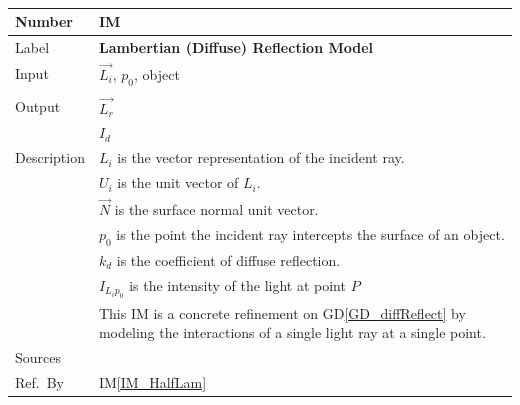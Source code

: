 \documentclass[12pt]{article}
\newcommand{\colAwidth}{0.13\textwidth}
\newcommand{\colBwidth}{0.82\textwidth}
\newcommand{\dref}[1]{GD\ref{#1}}
\newcounter{instnum} %
\newcommand{\iref}[1]{IM\ref{#1}}
\begin{document}
~\newline


\noindent
\begin{minipage}{\textwidth}
	\renewcommand*{\arraystretch}{1.5}
	\begin{tabular}{| p{\colAwidth} | p{\colBwidth}|}
		\hline
		\rowcolor[gray]{0.9}
		Number& IM{instnum}\theinstnum \label{IM_LamDiffuse}\\
		\hline
		Label& \bf Lambertian (Diffuse) Reflection Model\\
		\hline
		Input& $\vec{L_{i}}$, $p_{0}$, object\\
		& \\
		\hline
		Output& $\vec{L_{r}}$  \\
		&  $I_{d}$\\
		\hline
		Description & $L_{i}$ is the vector representation of the incident 
		ray.\\
		& $U_{i}$ is the unit vector of $L_{i}$.\\
		& $\vec{N}$ is the surface normal unit vector. \\
		& $p_{0}$ is the point the incident ray intercepts the surface of an 
		object. \\
		& $k_{d}$  is the coefficient of diffuse reflection.\\
		& $I_{L_{i}p_{0}}$ is the intensity of the light at point $P$\\
		& This IM is a concrete refinement on \dref{GD_diffReflect} by modeling 
		the interactions of a single light ray at a single point.\\
		\hline
		Sources& \cite{Comninos2005,Lengyel2003,shreiner2012} \\
		\hline
		Ref.\ By & \iref{IM_HalfLam}\\
		\hline
	\end{tabular}
\end{minipage}\\

  ~\newline
\end{document}

